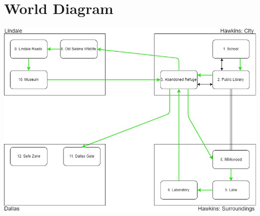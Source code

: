 \section{World Diagram}

\vspace*{1cm}
\begin{center}
	\includegraphics[width=0.9\linewidth]{images/graphs/worlddiagram.jpg}
\end{center}
